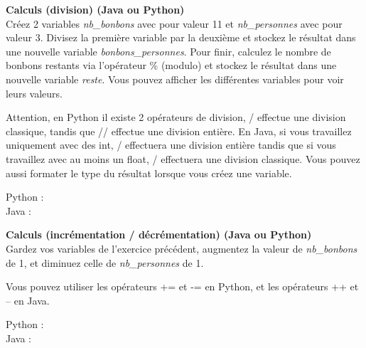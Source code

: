 \begin{Exercice}[5 minutes] \textbf{Calculs (division) (Java ou Python)}\\
   Créez 2 variables \textit{nb\_bonbons} avec pour valeur 11 et \textit{nb\_personnes} avec pour valeur 3. Divisez la première variable par la deuxième et stockez le résultat dans une nouvelle variable \textit{bonbons\_personnes}. Pour finir, calculez le nombre de bonbons restants via l'opérateur \% (modulo) et stockez le résultat dans une nouvelle variable \textit{reste}. Vous pouvez afficher les différentes variables pour voir leurs valeurs. \\
   
    \begin{conseil}
      	Attention, en Python il existe 2 opérateurs de division, / effectue une division classique, tandis que // effectue une division entière. En Java, si vous travaillez uniquement avec des int, / effectuera une division entière tandis que si vous travaillez avec au moins un float, / effectuera une division classique. Vous pouvez aussi formater le type du résultat lorsque vous créez une variable.
        
    \end{conseil}
    \begin{solution}
    
    Python : \\
    
    
    
    Java : \\
    
    
           
    \end{solution}   
\end{Exercice}

\begin{Exercice}[3 minutes] \textbf{Calculs (incrémentation / décrémentation) (Java ou Python)}\\
   Gardez vos variables de l'exercice précédent, augmentez la valeur de \textit{nb\_bonbons} de 1, et diminuez celle de \textit{nb\_personnes} de 1.  \\
   
    \begin{conseil}
      	Vous pouvez utiliser les opérateurs += et -= en Python, et les opérateurs ++ et -- en Java.
        
    \end{conseil}
    \begin{solution}
    
    Python : \\
    
    
    
    Java : \\
    
    
           
    \end{solution}   
\end{Exercice}

